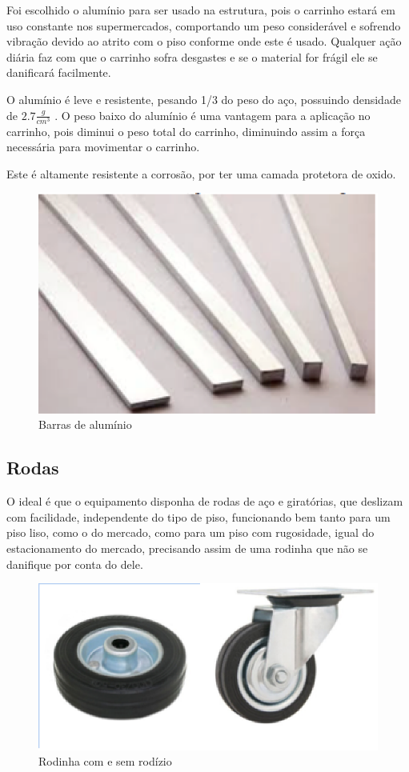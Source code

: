 \par Foi escolhido o alumínio para ser usado na estrutura, pois o carrinho estará em uso constante nos supermercados, comportando um peso considerável e sofrendo vibração devido ao atrito com o piso conforme onde este é usado. Qualquer ação diária faz com que o carrinho sofra desgastes e se o material for frágil ele se danificará facilmente.

\par O alumínio é leve e resistente, pesando 1/3 do peso do aço, possuindo densidade de $2.7\frac{g}{cm^3}$ . O peso baixo do alumínio é uma vantagem para a aplicação no carrinho, pois diminui o peso total do carrinho, diminuindo assim a força necessária para movimentar o carrinho.

\par Este é altamente resistente a corrosão, por ter uma camada protetora de oxido.

 \begin{figure}[ht]
		\centering
		\includegraphics[width=.4\textwidth]{figuras/barrasaluminio.png}
		\caption{Barras de alumínio}
		\label{fig:barrasaluminio}
	\end{figure} 

\subsection{Rodas}
O ideal é que o equipamento disponha de rodas de aço e giratórias, que deslizam com facilidade, independente do tipo de piso, funcionando bem tanto para um piso liso, como o do mercado, como para um piso com rugosidade, igual do estacionamento do mercado, precisando assim de uma rodinha que não se danifique por conta do dele.

 \begin{figure}[ht]
		\centering
		\includegraphics[width=.4\textwidth]{figuras/roda.png}
		\caption{Rodinha com e sem rodízio}
		\label{fig:roda}
	\end{figure} 

